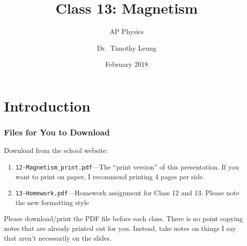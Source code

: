 \documentclass[12pt,aspectratio=169]{beamer}
\title{Class 13: Magnetism}
\subtitle{AP Physics}
\author[TML]{Dr.\ Timothy Leung}
\institute{Olympiads School}
\date{February 2018}
\begin{document}
\begin{frame}
  \maketitle
\end{frame}


\section[Intro]{Introduction}

\begin{frame}
  \frametitle{Files for You to Download}
  Download from the school website:
  \begin{enumerate}
  \item\texttt{12-Magnetism\_print.pdf}---The ``print version'' of this
    presentation. If you want to print on paper, I recommend printing 4 pages
    per side.
  \item\texttt{13-Homework.pdf}---Homework assignment for Class 12 and 13.
    Please note the new formatting style
  \end{enumerate}

  \vspace{.2in}Please download/print the PDF file before each class. There is
  no point copying notes that are already printed out for you. Instead, take
  notes on things I say that aren't necessarily on the slides.
\end{frame}
\end{document}
